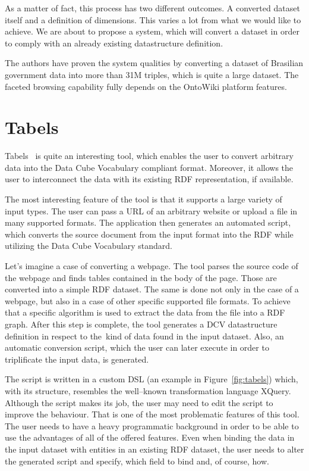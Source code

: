 As a matter of fact, this process has two different outcomes. A converted 
dataset itself and a definition of dimensions. This varies a lot from what 
we would like to achieve. We are about to propose a system, which will convert a 
dataset in order to comply with an already existing datastructure definition.

The authors have proven the system qualities by converting a dataset of Brasilian government data
into more than 31M triples, which is quite a large dataset. The faceted browsing
capability fully depends on the OntoWiki platform features.

\section{Tabels}
Tabels~\cite{tables} is quite an interesting tool, which enables the user to 
convert arbitrary data into the Data Cube Vocabulary compliant format. 
Moreover, it allows the user to interconnect the data with its existing RDF 
representation, if available.

The most interesting feature of the tool is that it supports a large variety of 
input types. The user can pass a URL of an arbitrary website or upload a file 
in many supported formats. The application then generates an 
automated script, which converts the source document from the input format 
into the RDF while utilizing the Data Cube Vocabulary standard.

Let's imagine a case of converting a webpage. The tool parses the source code of the webpage and 
finds tables contained in the body of the page. Those are converted into a simple
RDF dataset. The same is done not only in the case of a webpage, but also in a case
of other specific supported file formats. To achieve that a specific algorithm is used to extract
the data from the file into a RDF graph. After this step is complete, the tool generates a DCV
datastructure definition in respect to the~kind of data found in the input dataset.
Also, an automatic conversion script, which the user can later execute in order to triplificate
the input data, is generated.

The script is written in a custom DSL (an example in Figure~\ref{fig:tabels}) which,
with its structure, resembles the well--known
transformation language XQuery. Although the script makes its job, the 
user may need to edit the script to improve the behaviour. That is one of the 
most problematic features of this tool. The user needs to have a heavy programmatic 
background in order to be able to use the advantages of all of the offered features. 
Even when binding the data in the input dataset with entities in an existing RDF 
dataset, the user needs to alter the generated script and specify, which field 
to bind and, of course, how.

